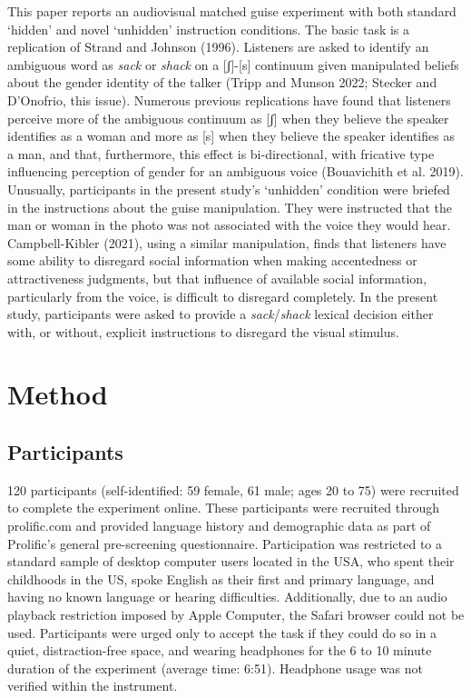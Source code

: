 \documentclass[
  letterpaper,
  DIV=11,
  numbers=noendperiod]{scrartcl}
\begin{document}
This paper reports an audiovisual matched guise experiment with both
standard `hidden' and novel `unhidden' instruction conditions. The basic
task is a replication of Strand and Johnson (1996). Listeners are asked
to identify an ambiguous word as \emph{sack} or \emph{shack} on a
{[}ʃ{]}-{[}s{]} continuum given manipulated beliefs about the gender
identity of the talker (Tripp and Munson 2022; Stecker and D'Onofrio,
this issue). Numerous previous replications have found that listeners
perceive more of the ambiguous continuum as {[}ʃ{]} when they believe
the speaker identifies as a woman and more as {[}s{]} when they believe
the speaker identifies as a man, and that, furthermore, this effect is
bi-directional, with fricative type influencing perception of gender for
an ambiguous voice (Bouavichith et al. 2019). Unusually, participants in
the present study's `unhidden' condition were briefed in the
instructions about the guise manipulation. They were instructed that the
man or woman in the photo was not associated with the voice they would
hear. Campbell-Kibler (2021), using a similar manipulation, finds that
listeners have some ability to disregard social information when making
accentedness or attractiveness judgments, but that influence of
available social information, particularly from the voice, is difficult
to disregard completely. In the present study, participants were asked
to provide a \emph{sack}/\emph{shack} lexical decision either with, or
without, explicit instructions to disregard the visual stimulus.

\section{Method}\label{sec-method}

\subsection{Participants}\label{sec-participants}

120 participants (self-identified: 59 female, 61 male; ages 20 to 75)
were recruited to complete the experiment online. These participants
were recruited through prolific.com and provided language history and
demographic data as part of Prolific's general pre-screening
questionnaire. Participation was restricted to a standard sample of
desktop computer users located in the USA, who spent their childhoods in
the US, spoke English as their first and primary language, and having no
known language or hearing difficulties. Additionally, due to an audio
playback restriction imposed by Apple Computer, the Safari browser could
not be used. Participants were urged only to accept the task if they
could do so in a quiet, distraction-free space, and wearing headphones
for the 6 to 10 minute duration of the experiment (average time: 6:51).
Headphone usage was not verified within the instrument.
\end{document}
